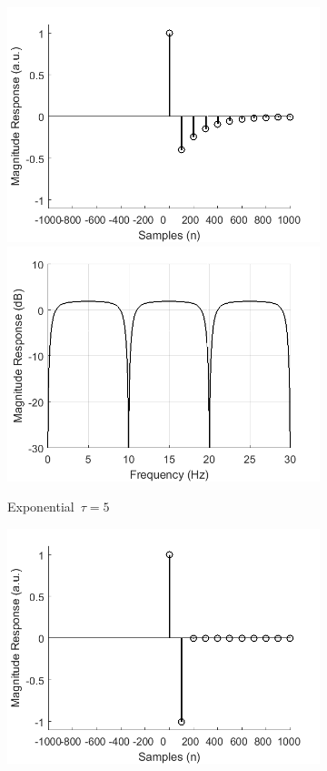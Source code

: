 \documentclass[a4paper]{article}
\begin{document}
\begin{figure}[hbtp]
\begin{subfigure}{.33\textwidth}
        \includegraphics[width=\textwidth]{img/tau/kernel_exp_5.png}\\
        \includegraphics[width=\textwidth]{img/tau/mag_exp_5.png}
        \caption{Exponential~$\tau=5$}\label{fig:ExpTau5}
    \end{subfigure}
    \begin{subfigure}{.33\textwidth}
        \includegraphics[width=\textwidth]{img/tau/kernel_exp_100.png}\\

\end{subfigure}
\end{figure}
\end{document}
